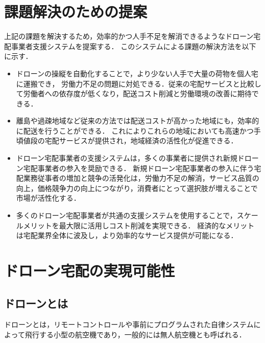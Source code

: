 \documentclass[a4paper, titlepage]{jsarticle}
\begin{document}
\section{課題解決のための提案}
上記の課題を解決するため，効率的かつ人手不足を解消できるようなドローン宅配事業者支援システムを提案する．
このシステムによる課題の解決方法を以下に示す．
\begin{itemize}
  \item ドローンの操縦を自動化することで，より少ない人手で大量の荷物を個人宅に運搬でき，
        労働力不足の問題に対処できる．従来の宅配サービスと比較して労働者への依存度が低くなり，配送コスト削減と労働環境の改善に期待できる．

  \item 離島や過疎地域など従来の方法では配送コストが高かった地域にも，効率的に配送を行うことができる．
        これによりこれらの地域においても高速かつ手頃値段の宅配サービスが提供され，地域経済の活性化が促進できる．

  \item ドローン宅配事業者の支援システムは，多くの事業者に提供され新規ドローン宅配事業者の参入を奨励できる．
        新規ドローン宅配事業者の参入に伴う宅配業務従事者の増加と競争の活発化は，労働力不足の解消，サービス品質の向上，価格競争力の向上につながり，消費者にとって選択肢が増えることで市場が活性化する．

  \item 多くのドローン宅配事業者が共通の支援システムを使用することで，スケールメリットを最大限に活用しコスト削減を実現できる．
        経済的なメリットは宅配業界全体に波及し，より効率的なサービス提供が可能になる．


\end{itemize}

\section{ドローン宅配の実現可能性}
\subsection{ドローンとは}
ドローンとは，リモートコントロールや事前にプログラムされた自律システムによって飛行する小型の航空機であり，一般的には無人航空機とも呼ばれる．
\end{document}
